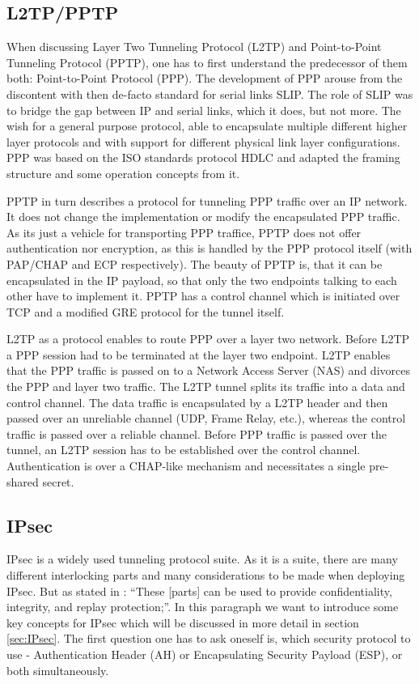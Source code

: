 \documentclass[a4paper]{report}
\begin{document}
\subsection{L2TP/PPTP}
\label{ssec:l2tppptp}
When discussing Layer Two Tunneling Protocol (L2TP) and Point-to-Point Tunneling Protocol (PPTP), one has to first understand the predecessor of them both: Point-to-Point Protocol (PPP).
The development of PPP arouse from the discontent with then de-facto standard for serial links SLIP. The role of SLIP was to bridge the gap between IP and serial links, which it does, but not more. The wish for a general purpose protocol, able to encapsulate multiple different higher layer protocols and with support for different physical link layer configurations. PPP was based on the ISO standards protocol HDLC and adapted the framing structure and some operation concepts from it.  \parencite{Kozierok2005}

PPTP in turn describes a protocol for tunneling PPP traffic over an IP network. It does not change the implementation or modify the encapsulated PPP traffic. As its just a vehicle for transporting PPP traffice, PPTP does not offer authentication nor encryption, as this is handled by the PPP protocol itself (with PAP/CHAP and ECP respectively). The beauty of PPTP is, that it can be encapsulated in the IP payload, so that only the two endpoints talking to each other have to implement it. PPTP has a control channel which is initiated over TCP and a modified GRE protocol for the tunnel itself. \parencite{Hamzeh1999}

L2TP as a protocol enables to route PPP over a layer two network. Before L2TP a PPP session had to be terminated at the layer two endpoint. L2TP enables that the PPP traffic is passed on to a Network Access Server (NAS) and divorces the PPP and layer two traffic. The L2TP tunnel splits its traffic into a data and control channel. The data traffic is encapsulated by a L2TP header and then passed over an unreliable channel (UDP, Frame Relay, etc.), whereas the control traffic is passed over a reliable channel. Before PPP traffic is passed over the tunnel, an L2TP session has to be established over the control channel. Authentication is over a CHAP-like mechanism and necessitates a single pre-shared secret. \parencite{Townsley1999}



\subsection{IPsec}
\label{ssec:IPsec}
IPsec is a widely used tunneling protocol suite. As it is a suite, there are many different interlocking parts and many considerations to be made when deploying IPsec. But as stated in \cite{Bellovin2009}: \textquotedblleft These [parts] can be used to provide confidentiality, integrity, and replay protection;\textquotedblright.
In this paragraph we want to introduce some key concepts for IPsec which will be discussed in more detail in section \ref{sec:IPsec}.
The first question one has to ask oneself is, which security protocol to use - Authentication Header (AH) or Encapsulating Security Payload (ESP), or both simultaneously. 
\end{document}
